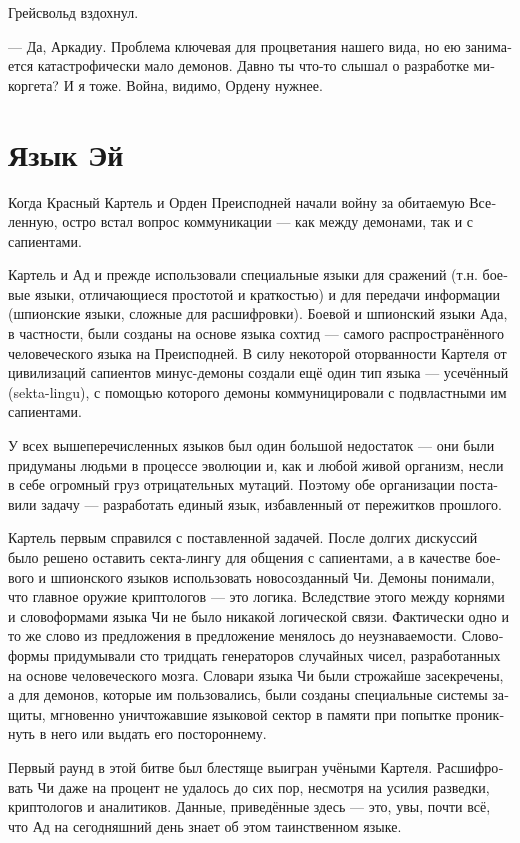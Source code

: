 \documentclass[a4paper,12pt,fleqn]{book}\usepackage{polyglossia}\setdefaultlanguage[babelshorthands=true]{russian}\setotherlanguage{english}\defaultfontfeatures{Ligatures=TeX,Mapping=tex-text}\usepackage{xcolor}\newcommand{\ml}[3]{#2}
\begin{document}
{Грейсвольд вздохнул.

--- Да, Аркадиу.
Проблема ключевая для процветания нашего вида, но ею занимается катастрофически мало демонов.
Давно ты что-то слышал о разработке микоргета?
И я тоже.
Война, видимо, Ордену нужнее.

\section{Язык Эй}

Когда Красный Картель и Орден Преисподней начали войну за обитаемую Вселенную, остро встал вопрос коммуникации --- как между демонами, так и с сапиентами.

Картель и Ад и прежде использовали специальные языки для сражений (т.н. боевые языки, отличающиеся простотой и краткостью) и для передачи информации (шпионские языки, сложные для расшифровки).
Боевой и шпионский языки Ада, в частности, были созданы на основе языка сохтид --- самого распространённого человеческого языка на Преисподней.
В силу некоторой оторванности Картеля от цивилизаций сапиентов минус-демоны создали ещё один тип языка --- усечённый (sekta-lingu), с помощью которого демоны коммуницировали с подвластными им сапиентами.

У всех вышеперечисленных языков был один большой недостаток --- они были придуманы людьми в процессе эволюции и, как и любой живой организм, несли в себе огромный груз отрицательных мутаций.
Поэтому обе организации поставили задачу --- разработать единый язык, избавленный от пережитков прошлого.

Картель первым справился с поставленной задачей.
После долгих дискуссий было решено оставить секта-лингу для общения с сапиентами, а в качестве боевого и шпионского языков использовать новосозданный Чи.
Демоны понимали, что главное оружие криптологов --- это логика.
Вследствие этого между корнями и словоформами языка Чи не было никакой логической связи.
Фактически одно и то же слово из предложения в предложение менялось до неузнаваемости.
Словоформы придумывали сто тридцать генераторов случайных чисел, разработанных на основе человеческого мозга.
Словари языка Чи были строжайше засекречены, а для демонов, которые им пользовались, были созданы специальные системы защиты, мгновенно уничтожавшие языковой сектор в памяти при попытке проникнуть в него или выдать его постороннему.

Первый раунд в этой битве был блестяще выигран учёными Картеля.
Расшифровать Чи даже на процент не удалось до сих пор, несмотря на усилия разведки, криптологов и аналитиков.
Данные, приведённые здесь --- это, увы, почти всё, что Ад на сегодняшний день знает об этом таинственном языке.

}
\end{document}
